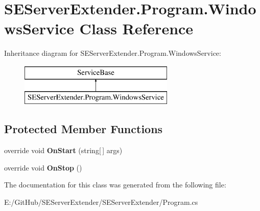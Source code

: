 \hypertarget{class_s_e_server_extender_1_1_program_1_1_windows_service}{}\section{S\+E\+Server\+Extender.\+Program.\+Windows\+Service Class Reference}
\label{class_s_e_server_extender_1_1_program_1_1_windows_service}
Inheritance diagram for S\+E\+Server\+Extender.\+Program.\+Windows\+Service\+:\begin{figure}[H]
\begin{center}
\leavevmode
\includegraphics[height=2.000000cm]{class_s_e_server_extender_1_1_program_1_1_windows_service}
\end{center}
\end{figure}
\subsection*{Protected Member Functions}
\begin{DoxyCompactItemize}
\item 
\hypertarget{class_s_e_server_extender_1_1_program_1_1_windows_service_a87772ce2d040e526bd576f9d6fd4af76}{}override void {\bfseries On\+Start} (string\mbox{[}$\,$\mbox{]} args)\label{class_s_e_server_extender_1_1_program_1_1_windows_service_a87772ce2d040e526bd576f9d6fd4af76}

\item 
\hypertarget{class_s_e_server_extender_1_1_program_1_1_windows_service_a284fb0fdbf6e70be2ccb7bd13f3cc236}{}override void {\bfseries On\+Stop} ()\label{class_s_e_server_extender_1_1_program_1_1_windows_service_a284fb0fdbf6e70be2ccb7bd13f3cc236}

\end{DoxyCompactItemize}


The documentation for this class was generated from the following file\+:\begin{DoxyCompactItemize}
\item 
E\+:/\+Git\+Hub/\+S\+E\+Server\+Extender/\+S\+E\+Server\+Extender/Program.\+cs\end{DoxyCompactItemize}
